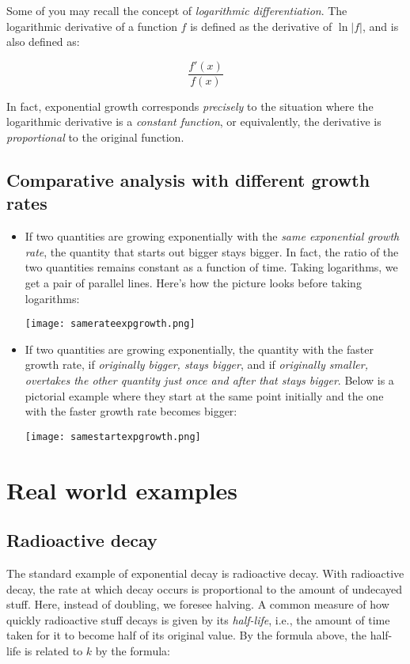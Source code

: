 \documentclass{amsart}
\begin{document}
Some of you may recall the concept of {\em logarithmic
differentiation}. The logarithmic derivative of a function $f$ is
defined as the derivative of $\ln|f|$, and is also defined as:

$$\frac{f'(x)}{f(x)}$$

In fact, exponential growth corresponds {\em precisely} to the
situation where the logarithmic derivative is a {\em constant
function}, or equivalently, the derivative is {\em proportional} to
the original function.

\subsection{Comparative analysis with different growth rates}

\begin{itemize}
\item If two quantities are growing exponentially with the {\em same
  exponential growth rate}, the quantity that starts out bigger stays
  bigger. In fact, the ratio of the two quantities remains constant as
  a function of time. Taking logarithms, we get a pair of parallel
  lines. Here's how the picture looks before taking logarithms:

  \texttt{[image: samerateexpgrowth.png]}
\item If two quantities are growing exponentially, the quantity with
  the faster growth rate, if {\em originally bigger, stays bigger},
  and if {\em originally smaller, overtakes the other quantity just
  once and after that stays bigger}. Below is a pictorial example
  where they start at the same point initially and the one with the
  faster growth rate becomes bigger:

  \texttt{[image: samestartexpgrowth.png]}
\end{itemize}

\section{Real world examples}

\subsection{Radioactive decay}

The standard example of exponential decay is radioactive decay. With
radioactive decay, the rate at which decay occurs is proportional to
the amount of undecayed stuff. Here, instead of doubling, we foresee
halving. A common measure of how quickly radioactive stuff decays is
given by its {\em half-life}, i.e., the amount of time taken for it to
become half of its original value. By the formula above, the half-life
is related to $k$ by the formula:
\end{document}
